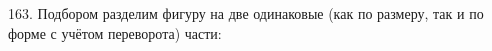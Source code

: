 163. Подбором разделим фигуру на две одинаковые (как по размеру, так и по форме с учётом переворота) части:
\begin{center}
\begin{figure}[ht!]
\end{figure}
\end{center}
